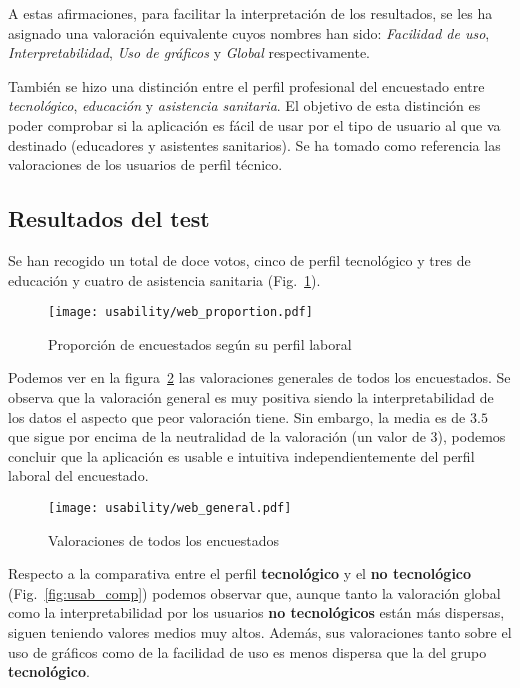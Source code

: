 A estas afirmaciones, para facilitar la interpretación de los resultados, se les ha asignado una valoración equivalente cuyos nombres han sido: \textit{Facilidad de uso}, \textit{Interpretabilidad}, \textit{Uso de gráficos} y \textit{Global} respectivamente.

También se hizo una distinción entre el perfil profesional del encuestado entre \textit{tecnológico}, \textit{educación} y \textit{asistencia sanitaria}. El objetivo de esta distinción es poder comprobar si la aplicación es fácil de usar por el tipo de usuario al que va destinado (educadores y asistentes sanitarios). Se ha tomado como referencia las valoraciones de los usuarios de perfil técnico. 

\subsection{Resultados del test}
Se han recogido un total de doce votos, cinco de perfil tecnológico y tres de educación y cuatro de asistencia sanitaria (Fig.~\ref{fig:usab_prop}).

\begin{figure}
	\centering
	\texttt{[image: usability/web\_proportion.pdf]}
	\caption{Proporción de encuestados según su perfil laboral}
	\label{fig:usab_prop}
\end{figure}

Podemos ver en la figura~\ref{fig:usab_global} las valoraciones generales de todos los encuestados. Se observa que la valoración general es muy positiva siendo la interpretabilidad de los datos el aspecto que peor valoración tiene. Sin embargo, la media es de $3.5$ que sigue por encima de la neutralidad de la valoración (un valor de $3$), podemos concluir que la aplicación es usable e intuitiva independientemente del perfil laboral del encuestado.

\begin{figure}
	\centering
	\texttt{[image: usability/web\_general.pdf]}
	\caption{Valoraciones de todos los encuestados}
	\label{fig:usab_global}
\end{figure}

Respecto a la comparativa entre el perfil \textbf{tecnológico} y el \textbf{no tecnológico} (Fig.~\ref{fig:usab_comp}) podemos observar que, aunque tanto la valoración global como la interpretabilidad por los usuarios \textbf{no tecnológicos} están más dispersas, siguen teniendo valores medios muy altos. Además, sus valoraciones tanto sobre el uso de gráficos como de la facilidad de uso es menos dispersa que la del grupo \textbf{tecnológico}.

